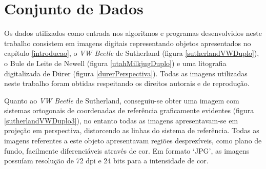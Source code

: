 \section{Conjunto de Dados}
	\label{secaoConjuntoDeDados}

	Os dados utilizados como entrada nos algoritmos e programas desenvolvidos neste trabalho consistem em imagens digitais representando objetos apresentados no capítulo \ref{introducao}, o \textit{VW Beetle} de Sutherland (figura \ref{sutherlandVWDuplo}), o Bule de Leite de Newell (figura \ref{utahMilkjugDuplo}) e uma litografia digitalizada de Dürer (figura \ref{durerPerspectiva}). Todas as imagens utilizadas neste trabalho foram obtidas respeitando os direitos autorais e de reprodução.
	
	Quanto ao \textit{VW Beetle} de Sutherland, conseguiu-se obter uma imagem com sistemas ortogonais de coordenadas de referência graficamente evidentes (figura \ref{sutherlandVWDuplo3}), no entanto todas as imagens apresentavam-se em projeção em perspectiva, distorcendo as linhas do sistema de referência. Todas as imagens referentes a este objeto apresentavam regiões desprezíveis, como plano de fundo, facilmente diferenciáveis através de cor. Em formato `JPG', as imagens possuíam resolução de 72 dpi e 24 bits para a intensidade de cor.

